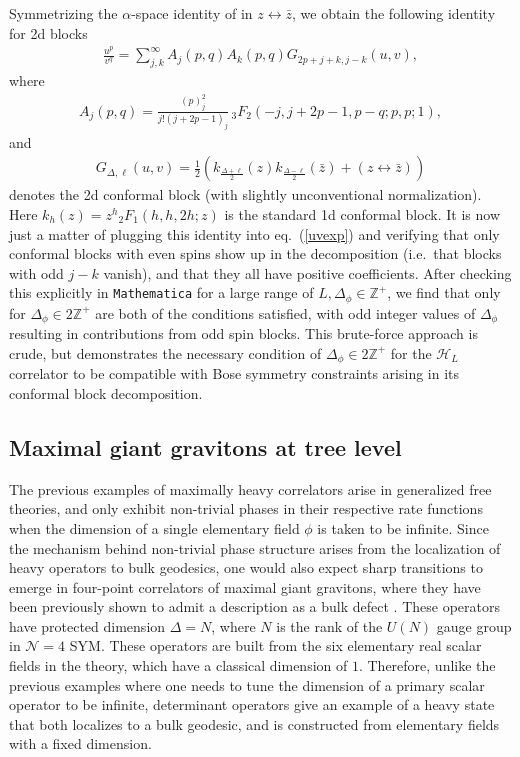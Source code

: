 \documentclass[a4paper,11pt]{article}
\theoremstyle{plain}
\theoremstyle{definition}
\theoremstyle{remark}
\newcommand{\ba}{\begin{equation} \begin{aligned}}
\newcommand{\ea}{\end{aligned} \end{equation}}
\newcommand{\Df}{\Delta_\phi}
\newcommand{\De}{\Delta}
\begin{document}
Symmetrizing the $\alpha$-space identity of \cite{Hogervorst:2017sfd} in $z \leftrightarrow \bar{z}$, we obtain the following identity for 2d blocks
\ba
\frac{u^p}{v^q} = \sum_{j,k}^\infty A_j(p,q) A_k(p,q) G_{2 p + j+k , j-k}(u,v),
\ea
where
\ba
A_j(p,q) = \frac{(p)_j^2 }{j! (j+2 p-1)_j} \, _3F_2(-j,j+2 p-1,p-q;p,p;1),
\ea
and
\ba
G_{\De,\ell}(u,v) = \frac{1}{2}\left( k_{\frac{\De +\ell}{2}}(z)k_{\frac{\De -\ell}{2}}(\bar{z}) + (z\leftrightarrow\bar{z})\right)
\ea
denotes the 2d conformal block (with slightly unconventional normalization). Here $k_h(z) = z^h {}_2 F_1(h,h,2h;z)$ is the standard 1d conformal block. It is now just a matter of plugging this identity into eq.~(\ref{uvexp}) and verifying that only conformal blocks with even spins show up in the decomposition (i.e.~that blocks with odd $j-k$ vanish), and that they all have positive coefficients. After checking this explicitly in \texttt{Mathematica} for a large range of $L, \Df \in \mathbb{Z}^+$, we find that only for $\Df \in 2\mathbb{Z}^+$ are both of the conditions satisfied, with odd integer values of $\Df$ resulting in contributions from odd spin blocks. This brute-force approach is crude, but demonstrates the necessary condition of $\Df \in 2\mathbb{Z}^+$ for the $\mathcal{H}_L$ correlator to be compatible with Bose symmetry constraints arising in its conformal block decomposition. 


\subsection{Maximal giant gravitons at tree level}
\label{giant graviton example}

The previous examples of maximally heavy correlators arise in generalized free theories, and only exhibit non-trivial phases in their respective rate functions when the dimension of a single elementary field $\phi$ is taken to be infinite. Since the mechanism behind non-trivial phase structure arises from the localization of heavy operators to bulk geodesics, one would also expect sharp transitions to emerge in four-point correlators of maximal giant gravitons, where they have been previously shown to admit a description as a bulk defect \cite{Chen:2025yxg,Chen:2026ium}. These operators have protected dimension $\De = N$, where $N$ is the rank of the $U(N)$ gauge group in $\mathcal{N} = 4$ SYM. These operators are built from the six elementary real scalar fields in the theory, which have a classical dimension of $1$. Therefore, unlike the previous examples where one needs to tune the dimension of a primary scalar operator to be infinite, determinant operators give an example of a heavy state that both localizes to a bulk geodesic, and is constructed from elementary fields with a fixed dimension.
\end{document}
